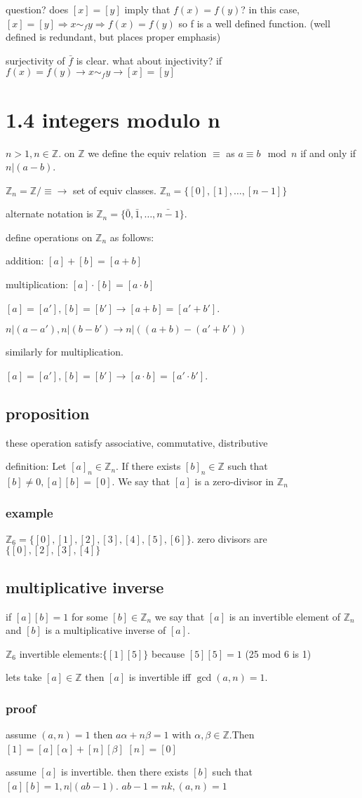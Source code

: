 \documentclass[letterpaper]{article}
\begin{document}
question? does $[x]=[y]$ imply that $f(x)=f(y)$? in this case, $[x]=[y]\Rightarrow x\sim_f y\Rightarrow f(x)=f(y)$ so f is a well defined function. (well defined is redundant, but places proper emphasis)

surjectivity of $\bar f$ is clear. what about injectivity? if $f(x)=f(y)\to x\sim_f y\to [x]=[y]$
\section*{1.4 integers modulo n}
$n>1,n\in\mathbb{Z}$. on $\mathbb{Z}$ we define the equiv relation $\equiv$ as $a\equiv b \mod n$ if and only if $n|(a-b)$. 

$\mathbb{Z}_n=\mathbb{Z}/\equiv\to$ set of equiv classes. $\mathbb{Z}_n=\{[0],[1],\dots,[n-1]\}$

alternate notation is $\mathbb{Z}_n=\{\bar0,\bar1,\dots,\bar{n-1}\}$.

define operations on $\mathbb{Z}_n$ as follows:

addition: $[a]+[b]=[a+b]$

multiplication: $[a]\cdot[b]=[a\cdot b]$

$[a]=[a'],[b]=[b']\to[a+b]=[a'+b']$.

$n|(a-a'),n|(b-b')\to n|((a+b)-(a'+b'))$

similarly for multiplication.

$[a]=[a'],[b]=[b']\to[a\cdot b]=[a'\cdot b']$.

\subsection*{proposition}
these operation satisfy associative, commutative, distributive

definition:
Let $[a]_n\in\mathbb{Z}_n$. If there exists $[b]_n\in\mathbb{Z}$ such that $[b]\ne 0, [a][b]=[0]$. We say that $[a]$ is a zero-divisor in $\mathbb{Z}_n$

\subsubsection*{example}
$\mathbb{Z}_6=\{[0],[1],[2],[3],[4],[5],[6]\}$. zero divisors are $\{[0],[2],[3],[4]\}$

\subsection*{multiplicative inverse}
if $[a][b]=1$ for some $[b]\in\mathbb{Z}_n$ we say that $[a]$ is an invertible element of $\mathbb{Z}_n$ and $[b]$ is a multiplicative inverse of $[a]$.

$\mathbb{Z}_6$ invertible elements:$\{[1][5]\}$ because $[5][5]=1$ (25 mod 6 is 1)

lets take $[a]\in \mathbb{Z}$ then $[a]$ is invertible iff $\gcd(a,n)=1$.
\subsubsection*{proof}
assume $(a,n)=1$ then $a\alpha+n\beta=1$ with $\alpha,\beta\in\mathbb{Z}$.Then $[1]=[a][\alpha]+[n][\beta]$ $[n]=[0]$

assume $[a]$ is invertible. then there exists $[b]$ such that $[a][b]=1, n|(ab-1)$. $ab-1=nk, (a,n)=1$
\end{document}
